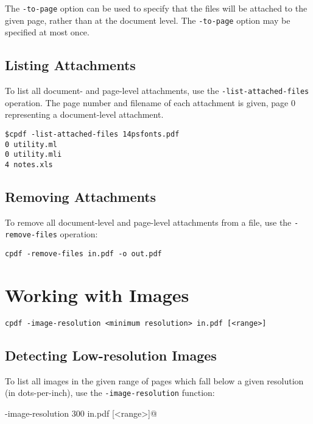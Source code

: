 \documentclass{book}
\begin{document}
  The \texttt{-to-page} option can be used to specify that the files will be attached to the given page, rather than at the document level. The \texttt{-to-page} option may be specified at most once. 

\section{Listing Attachments}
To list all document- and page-level attachments, use the \texttt{-list-attached-files} operation. The page number and filename of each attachment is given, page 0 representing a document-level attachment.
\begin{framed}
{\small\begin{verbatim}
$cpdf -list-attached-files 14psfonts.pdf
0 utility.ml
0 utility.mli
4 notes.xls
\end{verbatim}}
\end{framed}

  \section{Removing Attachments}
   To remove all document-level and page-level attachments from a file, use the \texttt{-remove-files} operation:
  \begin{framed}
    \small\verb!cpdf -remove-files in.pdf -o out.pdf!
  \end{framed}

\chapter{Working with Images}
\begin{framed}
\noindent\small\verb!cpdf -image-resolution <minimum resolution> in.pdf [<range>]!

\end{framed}
  \section{Detecting Low-resolution Images}
  To list all images in the given range of pages which fall below a given resolution (in dots-per-inch), use the \verb!-image-resolution! function:
  \begin{framed}
  \noindent\small\verb@cpdf -image-resolution 300 in.pdf [<range>]@
  \end{framed}
\end{document}
